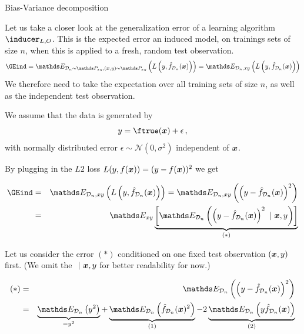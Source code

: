 \begin{vbframe} {Bias-Variance decomposition}

Let us take a closer look at the generalization error of a learning algorithm $\inducer_{L, O}$.
This is the expected error an induced model, on trainings sets of size $n$, when this is applied to a fresh, random test observation.
  $$\GEind = \E_{\D_n \sim \Pxy, (\xv, y) \sim \Pxy}\left( L\left(y, \fh_{\D_n}(\xv)\right) \right) = \E_{\D_n, xy}\left( L\left(y, \fh_{\D_n}(\xv)\right) \right)  $$
We therefore need to take the expectation over all training sets of size $n$, as well as the independent test observation.

\lz 

We assume that the data is generated by 
$$
y = \ftrue(\xv) + \epsilon\,,
$$
with normally distributed error $\epsilon \sim \mathcal{N}(0, \sigma^2)$ independent of $\bm{x}$.  

\framebreak 

By plugging in the $L2$ loss $L(y, f(\bm{x})) = (y - f(\bm{x}))^2$ we get

\begin{footnotesize}
\begin{eqnarray*}
\GEind &=& \E_{\D_n, xy}\left( L\left(y, \fh_{\D_n}(\xv)\right)\right) = \E_{\D_n, xy}\left(\left(y - \fh_{\D_n}(\xv)\right)^2\right) \\
&=& \E_{xy}\underbrace{\left[\E_{\D_n}\left(\left(y - \fh_{\D_n}(\xv)\right)^2~|~ \xv, y\right)\right]}_{(*)} 
\end{eqnarray*}
\end{footnotesize}

Let us consider the error $(*)$ conditioned on one fixed test observation $(\bm{x}, y)$ first. (We omit the $~|~\bm{x}, y$ for better readability for now.)

\begin{footnotesize}
\begin{eqnarray*}
(*) &=& \E_{\D_n}\left(\left(y - \fh_{\D_n}(\xv)\right)^2\right)\\
&=& \underbrace{\E_{\D_n}\left(y^2\right)}_{= y^2} + \underbrace{\E_{\D_n}\left(\fh_{\D_n}(\xv)^2\right)}_{(1)}  - 2\underbrace{\E_{\D_n}\left(y\fh_{\D_n}(\xv)\right)}_{(2)} 
\end{eqnarray*}
\end{footnotesize}


\end{vbframe}
